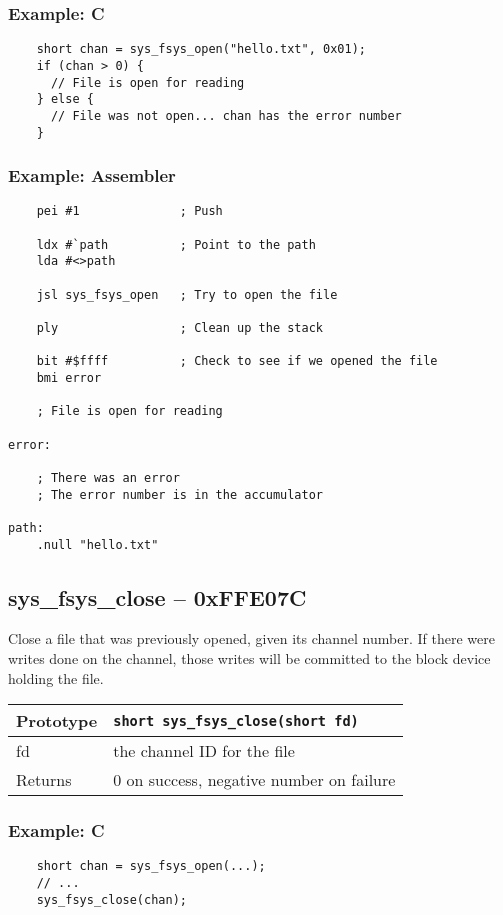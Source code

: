 \subsubsection*{Example: C}
\begin{lstlisting}
    short chan = sys_fsys_open("hello.txt", 0x01);
    if (chan > 0) {
      // File is open for reading
    } else {
      // File was not open... chan has the error number
    }
\end{lstlisting}

\subsubsection*{Example: Assembler}
\begin{verbatim}
    pei #1              ; Push 

    ldx #`path          ; Point to the path
    lda #<>path

    jsl sys_fsys_open   ; Try to open the file

    ply                 ; Clean up the stack

    bit #$ffff          ; Check to see if we opened the file
    bmi error

    ; File is open for reading

error:

    ; There was an error
    ; The error number is in the accumulator

path:
    .null "hello.txt"
\end{verbatim}


\subsection*{sys\_fsys\_close -- 0xFFE07C}
Close a file that was previously opened, given its channel number. If there were writes done on the channel, those writes will be committed to the block device holding the file.

\bigskip

\begin{tabular}{|l||l|} \hline
Prototype & \lstinline!short sys_fsys_close(short fd)! \\ \hline
fd & the channel ID for the file \\ \hline
Returns & 0 on success, negative number on failure \\ \hline
\end{tabular}

\subsubsection*{Example: C}
\begin{lstlisting}
    short chan = sys_fsys_open(...);
    // ...
    sys_fsys_close(chan);
\end{lstlisting}

